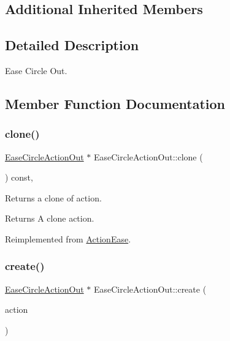\subsection*{Additional Inherited Members}


\subsection{Detailed Description}
Ease Circle Out. 

\subsection{Member Function Documentation}
\mbox{\label{classEaseCircleActionOut_af7b506b72c223ae7ed2268dad54e5416}} 
\subsubsection{\texorpdfstring{clone()}{clone()}}
{\footnotesize\ttfamily \hyperlink{classEaseCircleActionOut}{Ease\+Circle\+Action\+Out} $\ast$ Ease\+Circle\+Action\+Out\+::clone (\begin{DoxyParamCaption}\item[{void}]{ }\end{DoxyParamCaption}) const\hspace{0.3cm}{\ttfamily [override]}, {\ttfamily [virtual]}}

Returns a clone of action.

\begin{DoxyReturn}{Returns}
A clone action. 
\end{DoxyReturn}


Reimplemented from \hyperlink{classActionEase_a39bec93fe161fb732a74d8e51a2fe08b}{Action\+Ease}.

\mbox{\label{classEaseCircleActionOut_a4c13e168f159496d6a9990bf81e579ab}} 
\subsubsection{\texorpdfstring{create()}{create()}}
{\footnotesize\ttfamily \hyperlink{classEaseCircleActionOut}{Ease\+Circle\+Action\+Out} $\ast$ Ease\+Circle\+Action\+Out\+::create (\begin{DoxyParamCaption}\item[{\hyperlink{classActionInterval}{Action\+Interval} $\ast$}]{action }\end{DoxyParamCaption})\hspace{0.3cm}{\ttfamily [static]}}



